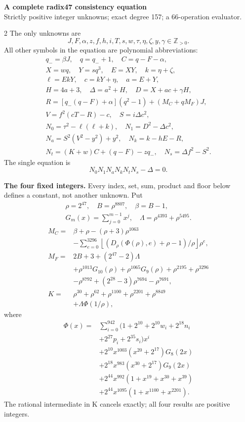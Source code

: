\documentclass[10pt]{article}
\newcommand{\fl}[1]{\left\lfloor#1\right\rfloor}
\begin{document}
\begin{center}
{\large\bfseries A complete radix47 consistency equation}\\[-1pt]
{\small Strictly positive integer unknowns; exact degree 157; a 66-operation evaluator.}
\end{center}\vspace{-8pt}
\begin{multicols}{2}
\fontsize{9}{9.5}\selectfont
The only unknowns are
\[
J,F,\alpha,z,f,h,i,T,s,w,\tau,\eta,\zeta,y,\gamma\in\mathbb Z_{>0}.
\]
All other symbols in the equation are polynomial abbreviations:
\[
\begin{gathered}
q_-=\beta J,\quad q=q_-+1,\quad C=q-F-\alpha,\\
X=wq,\quad Y=sq^3,\quad E=XY,\quad k=\eta+\zeta,\\
\ell=EkY,\quad c=kY+\eta,\quad a=E+Y,\\
H=4a+3,\quad\Delta=a^2+H,\quad D=X+ac+\gamma H,\\
R=[q_-(q-F)+\alpha](q^2-1)+(M_C+qM_F)J,\\
V=f^2(cT-R)-c,\quad S=i\Delta c^2,\\
N_0=\tau^2-\ell(\ell+k),\quad N_1=D^2-\Delta c^2,\\
N_a=S^2(V^2-y^2)+y^2,\quad N_k=k-hE-R,\\
N_t=(K+w)C+(q-F)-zq_-,\quad N_s=\Delta f^2-S^2.
\end{gathered}
\]
The single equation is
\[
\boxed{N_0N_1N_aN_kN_tN_s-\Delta=0.}
\]

\textbf{The four fixed integers.}
Every index, set, sum, product and floor below defines a constant, not
another unknown. Put
\[
\begin{gathered}
\rho=2^{47},\quad B=\rho^{8807},\quad\beta=B-1,\\
G_m(x)=\sum_{j=0}^{m-1}x^j,\quad
\Lambda=\rho^{4393}+\rho^{5495}.
\end{gathered}
\]
\begin{align*}
M_C={}&\beta+\rho-(\rho+3)\rho^{1063}\\
&-\sum_{e=0}^{3296}\fl{(D_\rho(\Phi(\rho),e)+\rho-1)/\rho}\rho^e,\\
M_F={}&2B+3+(2^{47}-2)\Lambda\\
&+\rho^{1013}G_{10}(\rho)+\rho^{1065}G_9(\rho)
  +\rho^{2195}+\rho^{3296}\\
&-\rho^{8792}+(2^{28}-3)\rho^{7694}-\rho^{7691},\\
K={}&\rho^{30}+\rho^{62}+\rho^{1100}+\rho^{2201}+\rho^{8849}\\
&+\Lambda\Phi(1/\rho),
\end{align*}
where
\[
\begin{split}
\Phi(x)={}&\sum_{i=0}^{942}(1+2^{10}+2^{10}w_i+2^{18}n_i\\
&+2^{27}p_i+2^{35}s_i)x^i\\
&+2^{10}x^{1003}(x^{20}+2^{17})G_8(2x)\\
&+2^{18}x^{983}(x^{30}+2^{17})G_9(2x)\\
&+2^{44}x^{992}(1+x^{19}+x^{30}+x^{39})\\
&+2^{44}x^{1095}(1+x^{1100}+x^{2201}).
\end{split}
\]
The rational intermediate in K cancels exactly; all four results are positive integers.


\end{multicols}
\end{document}
